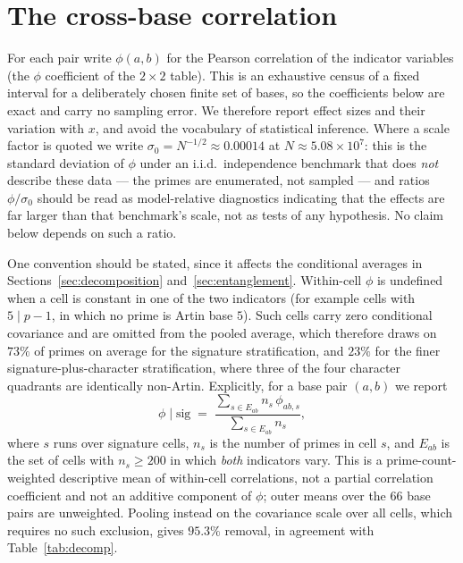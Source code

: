 \documentclass[11pt,reqno]{amsart}
\theoremstyle{plain}
\theoremstyle{definition}
\begin{document}
\section{The cross-base correlation}
\label{sec:measurement}

For each pair write $\phi(a,b)$ for the Pearson correlation of the indicator
variables (the $\phi$ coefficient of the $2\times2$ table). This is an exhaustive census of a fixed
interval for a deliberately chosen finite set of bases, so the coefficients
below are exact and carry no sampling error. We therefore report effect sizes
and their variation with $x$, and avoid the vocabulary of statistical
inference. Where a scale factor is quoted we write
$\sigma_0 = N^{-1/2} \approx 0.00014$ at $N \approx 5.08 \times 10^7$: this is
the standard deviation of $\phi$ under an i.i.d.\ independence benchmark that
does \emph{not} describe these data --- the primes are enumerated, not
sampled --- and ratios $\phi/\sigma_0$ should be read as model-relative
diagnostics indicating that the effects are far larger than that benchmark's
scale, not as tests of any hypothesis. No claim below depends on such a ratio.

One convention should be stated, since it affects the conditional averages in
Sections~\ref{sec:decomposition} and~\ref{sec:entanglement}. Within-cell $\phi$
is undefined when a cell is constant in one of the two indicators (for example
cells with $5 \mid p-1$, in which no prime is Artin base $5$). Such cells carry
zero conditional covariance and are omitted from the pooled average, which
therefore draws on $73\%$ of primes on average for the signature
stratification, and $23\%$ for the finer signature-plus-character
stratification, where three of the four character quadrants are identically
non-Artin. Explicitly, for a base pair $(a,b)$ we report
\[
  \phi \mid \mathrm{sig} \;=\;
  \frac{\sum_{s \in E_{ab}} n_s\,\phi_{ab,s}}{\sum_{s \in E_{ab}} n_s},
\]
where $s$ runs over signature cells, $n_s$ is the number of primes in cell $s$,
and $E_{ab}$ is the set of cells with $n_s \ge 200$ in which \emph{both}
indicators vary. This is a prime-count-weighted descriptive mean of within-cell
correlations, not a partial correlation coefficient and not an additive
component of $\phi$; outer means over the $66$ base pairs are unweighted.
Pooling instead on the covariance scale over all cells, which
requires no such exclusion, gives $95.3\%$ removal, in agreement with
Table~\ref{tab:decomp}.
\end{document}
